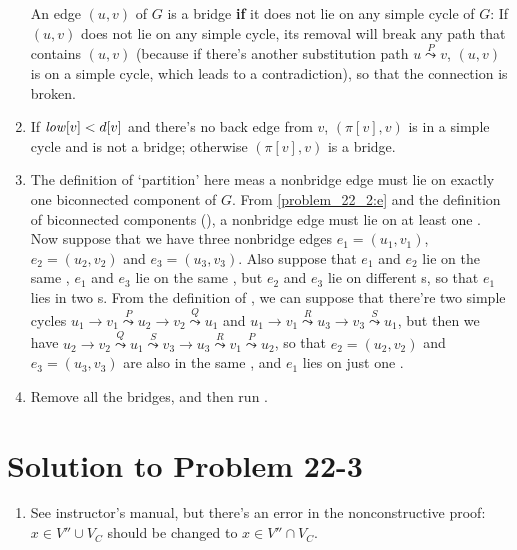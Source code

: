 \documentclass[a4paper, fleqn]{article}
\begin{document}
\begin{enumerate}[label=\itshape \bfseries \alph{enumi}]
An edge $(u, v)$ of $G$ is a bridge \textbf{if} it does not lie on any simple cycle of $G$: If $(u, v)$ does not lie on any simple cycle, its removal will break any path that contains $(u, v)$ (because if there's another substitution path $u \stackrel{P}{\leadsto} v$, $(u, v)$ is on a simple cycle, which leads to a contradiction), so that the connection is broken.

\item  %

If $\id{low}[v] < d[v]$ and there's no back edge from $v$, $(\pi[v], v)$ is in a simple cycle and is not a bridge; otherwise $(\pi[v], v)$ is a bridge.

\item  %

The definition of `partition' here meas a nonbridge edge must lie on exactly one biconnected component of $G$. From \ref{problem_22_2:e} and the definition of biconnected components (), a nonbridge edge must lie on at least one . Now suppose that we have three nonbridge edges $e_1 = (u_1, v_1)$, $e_2 = (u_2, v_2)$ and $e_3 = (u_3, v_3)$. Also suppose that $e_1$ and $e_2$ lie on the same , $e_1$ and $e_3$ lie on the same , but $e_2$ and $e_3$ lie on different s, so that $e_1$ lies in two s. From the definition of , we can suppose that there're two simple cycles $u_1 \to v_1 \stackrel{P}\leadsto u_2 \to v_2 \stackrel{Q}\leadsto u_1$ and $u_1 \to v_1 \stackrel{R}\leadsto u_3 \to v_3 \stackrel{S}\leadsto u_1$, but then we have $u_2 \to v_2 \stackrel{Q}\leadsto u_1 \stackrel{S}\leadsto v_3 \to u_3 \stackrel{R}\leadsto v_1 \stackrel{P}\leadsto u_2$, so that $e_2 = (u_2, v_2)$ and $e_3 = (u_3, v_3)$ are also in the same , and $e_1$ lies on just one .

\item  %

Remove all the bridges, and then run .

\end{enumerate}


\section*{Solution to Problem 22-3}

\begin{enumerate}[label=\itshape \bfseries \alph{enumi}]
\renewcommand{\labelenumi}{\itshape \bfseries \alph{enumi}.}

\item  %

See instructor's manual, but there's an error in the nonconstructive proof: $x \in V'' \cup V_C$ should be changed to $x \in V'' \cap V_C$.

\end{enumerate}
\end{document}
